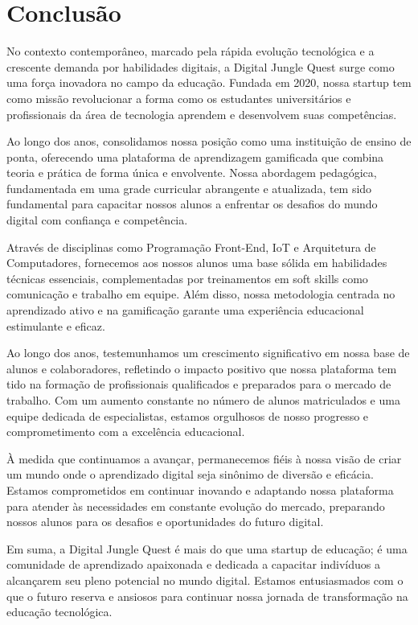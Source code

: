 \chapter{Conclusão}

No contexto contemporâneo, marcado pela rápida evolução tecnológica e a crescente demanda por habilidades digitais, a Digital Jungle Quest surge como uma força inovadora no campo da educação. Fundada em 2020, nossa startup tem como missão revolucionar a forma como os estudantes universitários e profissionais da área de tecnologia aprendem e desenvolvem suas competências.

Ao longo dos anos, consolidamos nossa posição como uma instituição de ensino de ponta, oferecendo uma plataforma de aprendizagem gamificada que combina teoria e prática de forma única e envolvente. Nossa abordagem pedagógica, fundamentada em uma grade curricular abrangente e atualizada, tem sido fundamental para capacitar nossos alunos a enfrentar os desafios do mundo digital com confiança e competência.

Através de disciplinas como Programação Front-End, IoT e Arquitetura de Computadores, fornecemos aos nossos alunos uma base sólida em habilidades técnicas essenciais, complementadas por treinamentos em soft skills como comunicação e trabalho em equipe. Além disso, nossa metodologia centrada no aprendizado ativo e na gamificação garante uma experiência educacional estimulante e eficaz.

Ao longo dos anos, testemunhamos um crescimento significativo em nossa base de alunos e colaboradores, refletindo o impacto positivo que nossa plataforma tem tido na formação de profissionais qualificados e preparados para o mercado de trabalho. Com um aumento constante no número de alunos matriculados e uma equipe dedicada de especialistas, estamos orgulhosos de nosso progresso e comprometimento com a excelência educacional.

À medida que continuamos a avançar, permanecemos fiéis à nossa visão de criar um mundo onde o aprendizado digital seja sinônimo de diversão e eficácia. Estamos comprometidos em continuar inovando e adaptando nossa plataforma para atender às necessidades em constante evolução do mercado, preparando nossos alunos para os desafios e oportunidades do futuro digital.

Em suma, a Digital Jungle Quest é mais do que uma startup de educação; é uma comunidade de aprendizado apaixonada e dedicada a capacitar indivíduos a alcançarem seu pleno potencial no mundo digital. Estamos entusiasmados com o que o futuro reserva e ansiosos para continuar nossa jornada de transformação na educação tecnológica.

